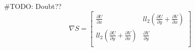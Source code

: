 \documentclass[../report.tex]{subfiles}
\begin{document}
\#TODO: Doubt??
\begin{equation}
  \nabla S = \begin{bmatrix}
    \frac{\partial U}{\partial x} & ll_2 (\frac{\partial U}{\partial y} + \frac{\partial V}{\partial x}) \\[12pt]
    ll_2 (\frac{\partial U}{\partial y} + \frac{\partial V}{\partial x}) & \frac{\partial V}{\partial y} \\
  \end{bmatrix}
\end{equation}
\end{document}
